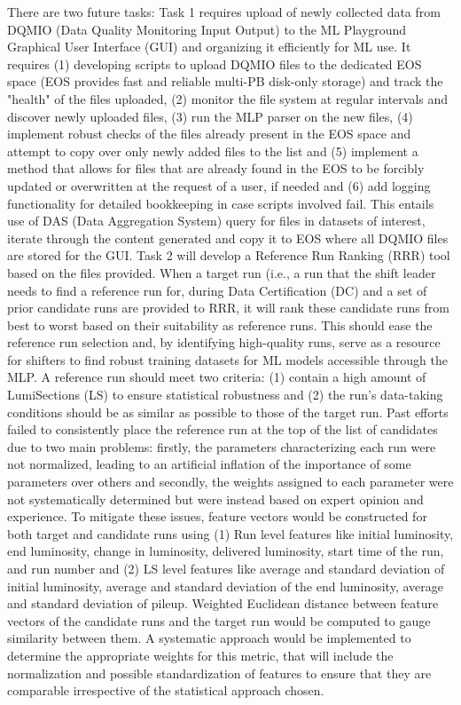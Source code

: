 There are two future tasks: Task 1 requires upload of newly collected data from DQMIO (Data Quality Monitoring Input Output) to the ML Playground Graphical User Interface (GUI) and organizing it efficiently for ML use. It requires (1) developing scripts to upload DQMIO files to the dedicated EOS space (EOS provides fast and reliable multi-PB disk-only storage) and track the "health" of the files uploaded, (2)  monitor the file system at regular intervals and discover newly uploaded files, (3) run the MLP parser on the new files, (4) implement robust checks of the files already present in the EOS space and attempt to copy over only newly added files to the list and (5) implement a method that allows for files that are already found in the EOS to be forcibly updated or overwritten at the request of a user, if needed and (6) add logging functionality for detailed bookkeeping in case scripts involved fail. This entails use of DAS (Data Aggregation System) query for files in datasets of interest, iterate through the content generated and copy it to EOS where all DQMIO files are stored for the GUI.
Task 2 will develop a Reference Run Ranking (RRR) tool based on the files provided. When a target run (i.e., a run that the shift leader needs to find a reference run for, during Data Certification (DC) and a set of prior candidate runs are provided to RRR, it will rank these candidate runs from best to worst based on their suitability as reference runs. This should ease the reference run selection and, by identifying high-quality runs, serve as a resource for shifters to find robust training datasets for ML models accessible through the MLP. A reference run should meet two criteria: (1) contain a high amount of LumiSections (LS) to ensure statistical robustness and (2) the run’s data-taking conditions should be as similar as possible to those of the target run.
Past efforts failed to consistently place the reference run at the top of the list of candidates due to two main problems: firstly, the parameters characterizing each run were not normalized, leading to an artificial inflation of the importance of some parameters over others and secondly, the weights assigned to each parameter were not systematically determined but were instead based on expert opinion and experience. To mitigate these issues, feature vectors would be constructed for both target and candidate runs using (1) Run level features like initial luminosity, end luminosity, change in luminosity, delivered luminosity, start time of the run, and run number and (2) LS level features like average and standard deviation of initial luminosity, average and standard deviation of the end luminosity, average and standard deviation of pileup. Weighted Euclidean distance between feature vectors of the candidate runs and the target run would be computed to gauge similarity between them. A systematic approach would be implemented to determine the appropriate weights for this metric, that will include the normalization and possible standardization of features to ensure that they are comparable irrespective of the statistical approach chosen.
